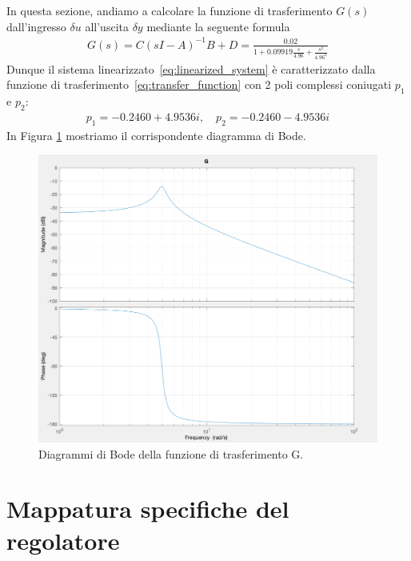 \documentclass[a4paper, 11pt]{article}
\begin{document}
In questa sezione, andiamo a calcolare la funzione di trasferimento $G(s)$ dall'ingresso $\delta u$ all'uscita $\delta y$ mediante la seguente formula 
%
%
\begin{align}\label{eq:transfer_function}
	G(s) = C(sI-A)^{-1}B + D = \frac{0.02}{1+0.09919\frac{s}{4.96}+\frac{s^2}{4.96^2}}
\end{align}
%
Dunque il sistema linearizzato~\eqref{eq:linearized_system} è caratterizzato dalla funzione di trasferimento~\eqref{eq:transfer_function} con 2 poli complessi coniugati $p_1$ e $p_2$:
\begin{align}
	p_1 = -0.2460 + 4.9536i, \quad p_2 = -0.2460 - 4.9536i
\end{align}
In Figura \ref{fig:G_bode} mostriamo il corrispondente diagramma di Bode. 

\begin{figure}[h!]
	\centering
	\includegraphics[width=0.75\linewidth]{./images/bode_G.png}
	\caption{Diagrammi di Bode della funzione di trasferimento G.}
	\label{fig:G_bode}
\end{figure}

\section{Mappatura specifiche del regolatore}
\label{sec:specifications}
\end{document}
